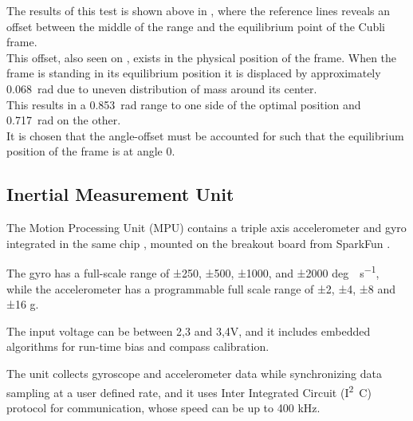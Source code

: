 The results of this test is shown above in , where the reference lines reveals an offset between the middle of the range and the equilibrium point of the Cubli frame.\\
This offset, also seen on , exists in the physical position of the frame. When the frame is standing in its equilibrium position it is displaced by approximately \SI{0,068}{rad} due to uneven distribution of mass around its center.\\
This results in a \SI{0,853}{rad} range to one side of the optimal position and \SI{0,717}{rad} on the other.\\
It is chosen that the angle-offset must be accounted for such that the equilibrium position of the frame is at angle 0.


\subsection{Inertial Measurement Unit}
The Motion Processing Unit (MPU) contains a triple axis accelerometer and gyro integrated in the same chip \cite{IMU}, mounted on the breakout board from SparkFun \cite{Sparkfun}.

The gyro has a  full-scale range of ±250, ±500, ±1000, and ±2000 \si{deg \cdot s^{-1}}, while the accelerometer has a programmable full scale range of ±2, ±4, ±8 and ±16 g.

The input voltage can be between 2,3 and 3,4V, and it includes embedded algorithms for run-time bias and compass calibration.

The unit collects gyroscope and accelerometer data while synchronizing data sampling at a user defined rate, and it uses Inter Integrated Circuit (\si{I^2C}) protocol for communication, whose speed can be up to 400 kHz. 


%
%

